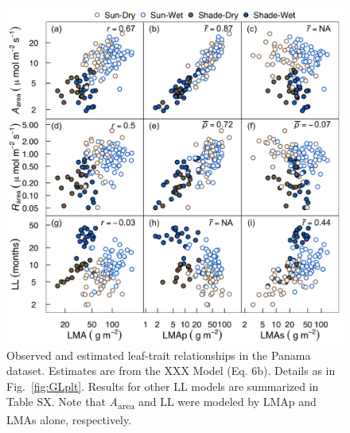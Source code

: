 \documentclass[
  12pt,
]{article}
\begin{document}
\begin{figure}
\hypertarget{fig:PAplt}{%
\centering
\includegraphics{../figs/PA_scatter.png}
\caption{Observed and estimated leaf-trait relationships in the Panama dataset.
Estimates are from the XXX Model (Eq. 6b).
Details as in Fig.~\ref{fig:GLplt}.
Results for other LL models are summarized in Table SX.
Note that \emph{A}\textsubscript{area} and LL were modeled by LMAp and LMAs alone, respectively.}\label{fig:PAplt}
}
\end{figure}

\newpage
\end{document}
